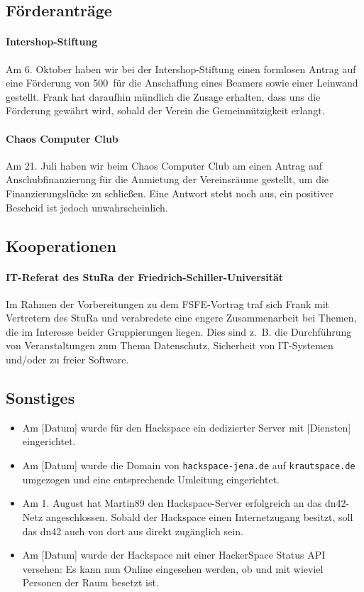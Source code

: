 \documentclass[10pt,DIV16]{scrartcl}
\begin{document}
\subsection{Förderanträge}

\paragraph{Intershop-Stiftung}

Am 6. Oktober haben wir bei der Intershop-Stiftung einen formlosen Antrag auf
eine Förderung von 500\EUR\ für die Anschaffung eines Beamers sowie einer
Leinwand gestellt.  Frank hat daraufhin mündlich die Zusage erhalten, dass uns
die Förderung gewährt wird, sobald der Verein die Gemeinnützigkeit erlangt.

\paragraph{Chaos Computer Club}

Am 21. Juli haben wir beim Chaos Computer Club am einen Antrag auf 
Anschubfinanzierung für die Anmietung der Vereinsräume gestellt, um 
die Finanzierungslücke zu schließen. Eine Antwort steht noch aus, 
ein positiver Bescheid ist jedoch unwahrscheinlich.


\subsection{Kooperationen}

\paragraph{IT-Referat des StuRa der Friedrich-Schiller-Universität}

Im Rahmen der Vorbereitungen zu dem FSFE-Vortrag traf sich Frank mit 
Vertretern des StuRa und verabredete eine engere Zusammenarbeit bei 
Themen, die im Interesse beider Gruppierungen liegen. Dies sind z.\,
B. die Durchführung von Veranstaltungen zum Thema Datenschutz, 
Sicherheit von IT-Systemen und/oder zu freier Software.

\subsection{Sonstiges}

\begin{itemize}
	\item
		Am [Datum] wurde für den Hackspace ein dedizierter Server mit
		[Diensten] eingerichtet.
	\item
		Am [Datum] wurde die Domain von \texttt{hackspace-jena.de} auf
		\texttt{krautspace.de} umgezogen und eine entsprechende Umleitung
		eingerichtet.
	\item
		Am 1. August hat Martin89 den Hackspace-Server erfolgreich an das
		dn42-Netz angeschlossen.  Sobald der Hackspace einen Internetzugang
		besitzt, soll das dn42 auch von dort aus direkt zugänglich sein.
	\item
		Am [Datum] wurde der Hackspace mit einer HackerSpace Status API
		versehen:  Es kann nun Online eingesehen werden, ob und mit wieviel
		Personen der Raum besetzt ist.
\end{itemize}
\end{document}
